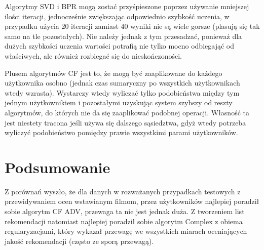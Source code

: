 \documentclass{pracamgr}
\begin{document}
    Algorytmy SVD i BPR mogą zostać przyśpieszone poprzez używanie mniejszej ilości iteracji, jednocześnie zwiększając odpowiednio szybkość uczenia,
    w przypadku użycia 20 iteracji zamiast 40 wyniki nie są wiele gorsze (plasują się tak samo na tle pozostałych). Nie należy jednak z tym przesadzać,
    ponieważ dla dużych szybkości uczenia wartości potrafią nie tylko mocno odbiegająć od właściwych, ale również rozbiegać się do nieskończoności.
    
    Plusem algorytmów CF jest to, że mogą być zaaplikowane do każdego użytkownika osobno (jednak czas sumaryczny po wszystkich użytkownikach wtedy wzrasta).
    Wystarczy wtedy wyliczać tylko podobieństwa między tym jednym użytkownikiem i pozostałymi uzyskując system szybszy od reszty algorytmów,
    do których nie da się zaaplikować podobnej operacji. Własność ta jest niestety tracona jeśli używa się dalszego sąsiedztwa, gdyż wtedy potrzeba wyliczyć
    podobieństwo pomiędzy prawie wszystkimi parami użytkowników.
   \section{Podsumowanie}
    Z porównań wyszło, że dla danych \cite{ML} w rozważanych przypadkach testowych z przewidywaniem ocen wstawianym filmom, przez użytkowników
    najlepiej poradził sobie algorytm CF ADV, przewaga ta nie jest jednak duża.
    Z tworzeniem list rekomendacji natomiast najlepiej poradził sobie algorytm Complex z obiema regularyzacjami,
    który wykazał przewagę we wszystkich miarach oceniających jakość rekomendacji (często ze sporą przewagą).
    
\end{document}
